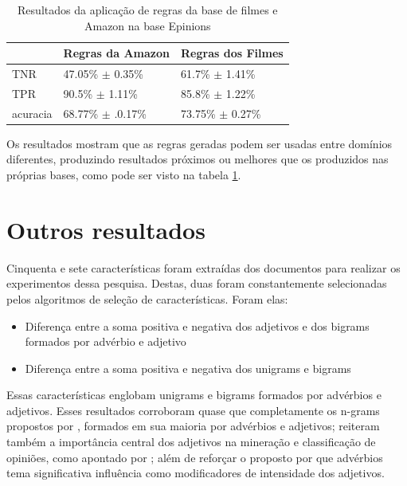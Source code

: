 \documentclass[template.tex]{subfiles}
\begin{document}
\begin{table}[!h]
    \begin{tabular}{lll}
    ~               & Regras da Amazon                  & Regras dos Filmes \\ \hline
    TNR             & 47.05\% $\pm$ 0.35\%           & 61.7\% $\pm$ 1.41\%    \\
    TPR         & 90.5\% $\pm$ 1.11\%               & 85.8\% $\pm$ 1.22\%   \\
    acuracia    & 68.77\% $\pm$ .0.17\%             & 73.75\% $\pm$ 0.27\%    \\
    \end{tabular}
    \caption{Resultados da aplicação de regras da base de filmes e Amazon na base Epinions}
    \label{table:epinions}
\end{table}

Os resultados mostram que as regras geradas podem ser usadas entre domínios diferentes, produzindo resultados próximos ou melhores que os produzidos nas próprias bases, como pode ser visto na tabela \ref{table:epinions}.

\section{Outros resultados}

Cinquenta e sete características foram extraídas dos documentos para realizar os experimentos dessa pesquisa. Destas, duas foram constantemente selecionadas pelos algoritmos de seleção de características. Foram elas:
\begin{itemize}
\item Diferença entre a soma positiva e negativa dos adjetivos e dos bigrams formados por advérbio e adjetivo
\item Diferença entre a soma positiva e negativa dos unigrams e bigrams
\end{itemize}

Essas características englobam unigrams e bigrams formados por advérbios e adjetivos. Esses resultados corroboram quase que completamente os n-grams propostos por \cite{turney2002thumbs}, formados em sua maioria por advérbios e adjetivos; reiteram também a importância central dos adjetivos na mineração e classificação de opiniões, como apontado por \cite{voll2007not}; além de reforçar o proposto por \cite{benamara2007sentiment} que advérbios tema significativa influência como modificadores de intensidade dos adjetivos.
\end{document}
